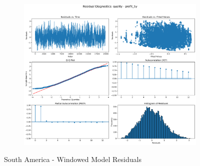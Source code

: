 \documentclass[11pt,english,a4paper,hidelinks]{book}
\begin{document}
\begin{figure}[H]
\begin{subfigure}[b]{0.32\textwidth}
    \end{subfigure}
    \hfill
    \begin{subfigure}[b]{0.32\textwidth}
    \centering
    \includegraphics[width=\textwidth]{images/code/models/linear_regression/first_model/LAT/quality_profit_5y_residuals - Gaussian.png}
    \end{subfigure}
    \caption{South America - Windowed Model Residuals}
    \label{fig:linear_regression_LAT_residues_windowed}
\end{figure}
\end{document}
